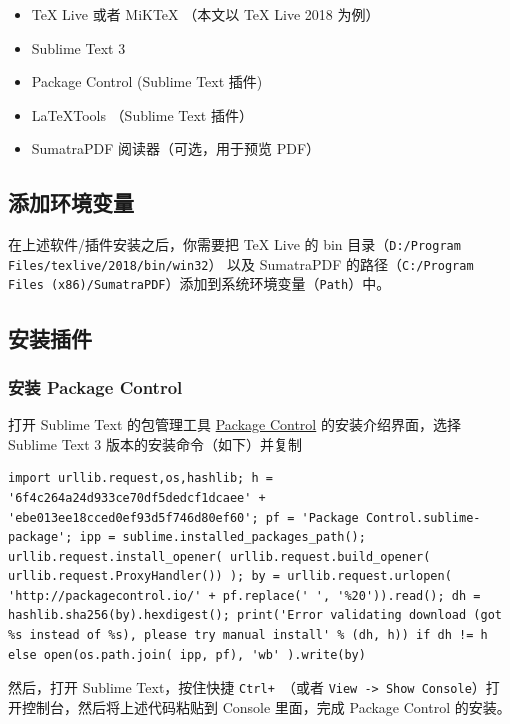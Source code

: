 \documentclass{article}
\begin{document}
\begin{itemize}
  \item \TeX{} Live 或者 MiKTeX （本文以 \TeX{} Live 2018 为例）
  \item Sublime Text 3
  \item Package Control (Sublime Text 插件)
  \item LaTeXTools （Sublime Text 插件）
  \item SumatraPDF 阅读器（可选，用于预览 PDF）
\end{itemize}

\subsection{添加环境变量}

在上述软件/插件安装之后，你需要把 \TeX{} Live 的 bin 目录（\texttt{D:/Program Files/texlive/2018/bin/win32}） 以及 SumatraPDF 的路径（\texttt{C:/Program Files (x86)/SumatraPDF}）添加到系统环境变量（\texttt{Path}）中。


\subsection{安装插件}
\subsubsection{安装 Package Control}
打开 Sublime Text 的包管理工具 \href{https://packagecontrol.io/installation}{Package Control} 的安装介绍界面，选择 Sublime Text 3 版本的安装命令（如下）并复制

\begin{verbatim}
import urllib.request,os,hashlib; h = '6f4c264a24d933ce70df5dedcf1dcaee' + 'ebe013ee18cced0ef93d5f746d80ef60'; pf = 'Package Control.sublime-package'; ipp = sublime.installed_packages_path(); urllib.request.install_opener( urllib.request.build_opener( urllib.request.ProxyHandler()) ); by = urllib.request.urlopen( 'http://packagecontrol.io/' + pf.replace(' ', '%20')).read(); dh = hashlib.sha256(by).hexdigest(); print('Error validating download (got %s instead of %s), please try manual install' % (dh, h)) if dh != h else open(os.path.join( ipp, pf), 'wb' ).write(by)
\end{verbatim}

然后，打开 Sublime Text，按住快捷 \texttt{Ctrl+~}（或者 \texttt{View -> Show Console}）打开控制台，然后将上述代码粘贴到 Console 里面，完成 Package Control 的安装。
\end{document}
